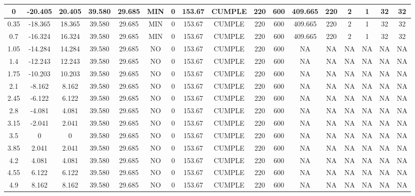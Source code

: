 \begin{table}[H]
{\begin{tabular}{|c|c|c|c|c|c|c|c|c|c|c|c|c|c|c|c|c|}
    \hline
    0   & -20.405 & 20.405 & 39.580 & 29.685 & MIN & 0   & 153.67 & CUMPLE & 220 & 600 & 409.665 & 220 & 2   & 1   & 32  & 32 \bigstrut\\
    \hline
    0.35 & -18.365 & 18.365 & 39.580 & 29.685 & MIN & 0   & 153.67 & CUMPLE & 220 & 600 & 409.665 & 220 & 2   & 1   & 32  & 32 \bigstrut\\
    \hline
    0.7 & -16.324 & 16.324 & 39.580 & 29.685 & MIN & 0   & 153.67 & CUMPLE & 220 & 600 & 409.665 & 220 & 2   & 1   & 32  & 32 \bigstrut\\
    \hline
    1.05 & -14.284 & 14.284 & 39.580 & 29.685 & NO  & 0   & 153.67 & CUMPLE & 220 & 600 & NA  & NA  & NA  & NA  & NA  & NA \bigstrut\\
    \hline
    1.4 & -12.243 & 12.243 & 39.580 & 29.685 & NO  & 0   & 153.67 & CUMPLE & 220 & 600 & NA  & NA  & NA  & NA  & NA  & NA \bigstrut\\
    \hline
    1.75 & -10.203 & 10.203 & 39.580 & 29.685 & NO  & 0   & 153.67 & CUMPLE & 220 & 600 & NA  & NA  & NA  & NA  & NA  & NA \bigstrut\\
    \hline
    2.1 & -8.162 & 8.162 & 39.580 & 29.685 & NO  & 0   & 153.67 & CUMPLE & 220 & 600 & NA  & NA  & NA  & NA  & NA  & NA \bigstrut\\
    \hline
    2.45 & -6.122 & 6.122 & 39.580 & 29.685 & NO  & 0   & 153.67 & CUMPLE & 220 & 600 & NA  & NA  & NA  & NA  & NA  & NA \bigstrut\\
    \hline
    2.8 & -4.081 & 4.081 & 39.580 & 29.685 & NO  & 0   & 153.67 & CUMPLE & 220 & 600 & NA  & NA  & NA  & NA  & NA  & NA \bigstrut\\
    \hline
    3.15 & -2.041 & 2.041 & 39.580 & 29.685 & NO  & 0   & 153.67 & CUMPLE & 220 & 600 & NA  & NA  & NA  & NA  & NA  & NA \bigstrut\\
    \hline
    3.5 & 0   & 0   & 39.580 & 29.685 & NO  & 0   & 153.67 & CUMPLE & 220 & 600 & NA  & NA  & NA  & NA  & NA  & NA \bigstrut\\
    \hline
    3.85 & 2.041 & 2.041 & 39.580 & 29.685 & NO  & 0   & 153.67 & CUMPLE & 220 & 600 & NA  & NA  & NA  & NA  & NA  & NA \bigstrut\\
    \hline
    4.2 & 4.081 & 4.081 & 39.580 & 29.685 & NO  & 0   & 153.67 & CUMPLE & 220 & 600 & NA  & NA  & NA  & NA  & NA  & NA \bigstrut\\
    \hline
    4.55 & 6.122 & 6.122 & 39.580 & 29.685 & NO  & 0   & 153.67 & CUMPLE & 220 & 600 & NA  & NA  & NA  & NA  & NA  & NA \bigstrut\\
    \hline
    4.9 & 8.162 & 8.162 & 39.580 & 29.685 & NO  & 0   & 153.67 & CUMPLE & 220 & 600 & NA  & NA  & NA  & NA  & NA  & NA \bigstrut\\

\end{tabular}}
\end{table}
